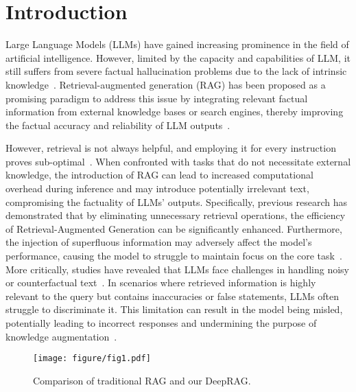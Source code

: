 
\section{Introduction}

Large Language Models (LLMs) have gained increasing prominence in the field of artificial intelligence.
However, limited by the capacity and capabilities of LLM, it still suffers from severe factual hallucination problems due to the lack of intrinsic knowledge~\cite{zhang2023hallucination}.
Retrieval-augmented generation (RAG) has been proposed as a promising paradigm to address this issue by integrating relevant factual information from external knowledge bases or search engines, thereby improving the factual accuracy and reliability of LLM outputs~\cite{zhao2024retrieval}.

However, retrieval is not always helpful, and employing it for every instruction proves sub-optimal~\cite{chen2023understanding,tan2024blinded}.
When confronted with tasks that do not necessitate external knowledge, the introduction of RAG can lead to increased computational overhead during inference and may introduce potentially irrelevant text, compromising the factuality of LLMs' outputs.
% 
Specifically, previous research has demonstrated that by eliminating unnecessary retrieval operations, the efficiency of Retrieval-Augmented Generation can be significantly enhanced.
% 
Furthermore, the injection of superfluous information may adversely affect the model's performance, causing the model to struggle to maintain focus on the core task~\cite{liu-etal-2024-lost}.
% 
More critically, studies have revealed that LLMs face challenges in handling noisy or counterfactual text~\cite{chen2024benchmarking}. In scenarios where retrieved information is highly relevant to the query but contains inaccuracies or false statements, LLMs often struggle to discriminate it. This limitation can result in the model being misled, potentially leading to incorrect responses and undermining the purpose of knowledge augmentation~\cite{bian2024influence}.


\begin{figure}[t]
    \centering
    \texttt{[image: figure/fig1.pdf]}
    \caption{Comparison of traditional RAG and our DeepRAG.}
    \label{fig:comparison}
\end{figure}


